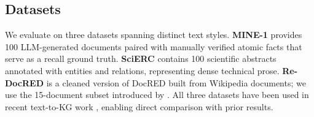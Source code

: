 \documentclass[11pt]{article}
\begin{document}


\subsection{Datasets}
\label{sec:datasets}
We evaluate on three datasets spanning distinct text styles. \textbf{MINE-1} \citep{kggen} provides 100 LLM-generated documents paired with manually verified atomic facts that serve as a recall ground truth. \textbf{SciERC} \citep{scierc} contains 100 scientific abstracts    annotated with entities and relations, representing dense technical prose. \textbf{Re-DocRED} \citep{redocred} is a cleaned version of DocRED \citep{docred} built from Wikipedia documents; we use the 15-document subset introduced by \citet{lkd-kgc}. All three datasets have been used in recent text-to-KG work \citep{graphjudge, rakg}, enabling direct comparison with prior results.
\end{document}
